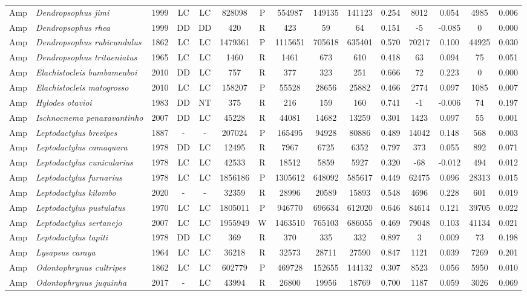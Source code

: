 \documentclass[12pt,openright,oneside,a4paper,english]{abntex2}
\begin{document}
\begin{landscape}
\begin{longtable}{llccccccccccccc}
		Amp&\textit{Dendropsophus jimi}&1999&LC&LC&828098&P&554987&149135&141123&0.254&8012&0.054&4985&0.006\\
		Amp&\textit{Dendropsophus rhea}&1999&DD&DD&420&R&423&59&64&0.151&-5&-0.085&0&0.000\\
		Amp&\textit{Dendropsophus rubicundulus}&1862&LC&LC&1479361&P&1115651&705618&635401&0.570&70217&0.100&44925&0.030\\
		Amp&\textit{Dendropsophus tritaeniatus}&1965&LC&LC&1460&R&1461&673&610&0.418&63&0.094&75&0.051\\
		Amp&\textit{Elachistocleis bumbameuboi}&2010&DD&LC&757&R&377&323&251&0.666&72&0.223&0&0.000\\
		Amp&\textit{Elachistocleis matogrosso}&2010&LC&LC&158207&P&55528&28656&25882&0.466&2774&0.097&1085&0.007\\
		Amp&\textit{Hylodes otavioi}&1983&DD&NT&375&R&216&159&160&0.741&-1&-0.006&74&0.197\\
		Amp&\textit{Ischnocnema penaxavantinho}&2007&DD&LC&45228&R&44081&14682&13259&0.301&1423&0.097&55&0.001\\
		Amp&\textit{Leptodactylus brevipes}&1887&-&-&207024&P&165495&94928&80886&0.489&14042&0.148&568&0.003\\
		Amp&\textit{Leptodactylus camaquara}&1978&DD&LC&12495&R&7967&6725&6352&0.797&373&0.055&892&0.071\\
		Amp&\textit{Leptodactylus cunicularius}&1978&LC&LC&42533&R&18512&5859&5927&0.320&-68&-0.012&494&0.012\\
		Amp&\textit{Leptodactylus furnarius}&1978&LC&LC&1856186&P&1305612&648092&585617&0.449&62475&0.096&28313&0.015\\
		Amp&\textit{Leptodactylus kilombo}&2020&-&-&32359&R&28996&20589&15893&0.548&4696&0.228&601&0.019\\
		Amp&\textit{Leptodactylus pustulatus}&1970&LC&LC&1805011&P&946770&696634&612020&0.646&84614&0.121&39705&0.022\\
		Amp&\textit{Leptodactylus sertanejo}&2007&LC&LC&1955949&W&1463510&765103&686055&0.469&79048&0.103&41134&0.021\\
		Amp&\textit{Leptodactylus tapiti}&1978&DD&LC&369&R&370&335&332&0.897&3&0.009&73&0.198\\
		Amp&\textit{Lysapsus caraya}&1964&LC&LC&36218&R&32573&28711&27590&0.847&1121&0.039&7269&0.201\\
		Amp&\textit{Odontophrynus cultripes}&1862&LC&LC&602779&P&469728&152655&144132&0.307&8523&0.056&5950&0.010\\
		Amp&\textit{Odontophrynus juquinha}&2017&-&LC&43994&R&26800&19956&18769&0.700&1187&0.059&3026&0.069\\

\end{longtable}
\end{landscape}
\end{document}
